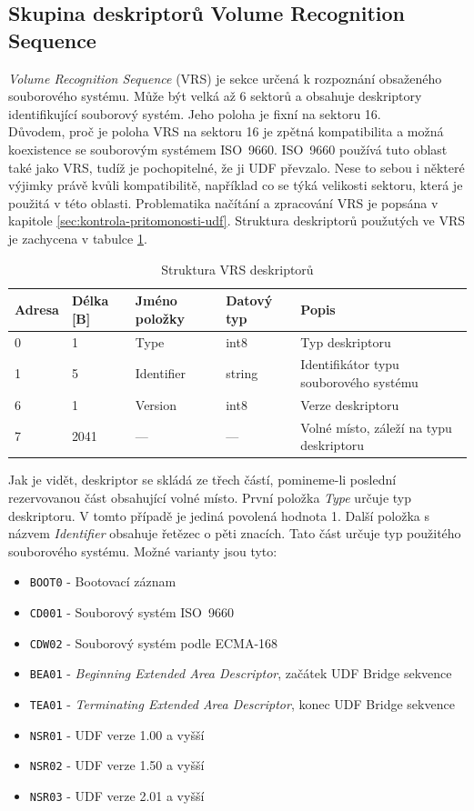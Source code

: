 \subsection{Skupina deskriptorů Volume Recognition Sequence}
\label{subsec:vrs}
\textit{Volume Recognition Sequence} (VRS) je sekce určená k rozpoznání obsaženého souborového systému. Může být velká až 6 sektorů a obsahuje deskriptory identifikující souborový systém. Jeho poloha je fixní na sektoru 16.\\
Důvodem, proč je poloha VRS na sektoru 16 je zpětná kompatibilita a možná koexistence se souborovým systémem ISO~9660. ISO~9660 používá tuto oblast také jako VRS, tudíž je pochopitelné, že ji UDF převzalo. Nese to sebou i některé výjimky právě kvůli kompatibilitě, například co se týká velikosti sektoru, která je použitá v této oblasti. Problematika načítání a zpracování VRS je popsána v kapitole \ref{sec:kontrola-pritomonosti-udf}.
Struktura deskriptorů použutých ve VRS je zachycena v tabulce \ref{tab:vrs}.
\begin{table}
    \centering
    \begin{tabular}{ | l | l | l | l | l | }
        \hline
        Adresa  & Délka [B]   & Jméno položky & Datový typ    & Popis \\ \hline\hline
        0       & 1             & Type           & int8          & Typ deskriptoru \\ \hline
        1       & 5             & Identifier & string        & Identifikátor typu souborového systému \\ \hline
        6       & 1             & Version         & int8          & Verze deskriptoru \\ \hline
        7       & 2041          & ---           & ---           & Volné místo, záleží na typu deskriptoru \\ \hline
    \end{tabular}
    \caption{Struktura VRS deskriptorů\label{tab:vrs}}
\end{table}
Jak je vidět, deskriptor se skládá ze třech částí, pomineme-li poslední rezervovanou část obsahující volné místo. První položka \textit{Type} určuje typ deskriptoru. V tomto případě je jediná povolená hodnota 1. Další položka s názvem \textit{Identifier} obsahuje řetězec o pěti znacích. Tato část určuje typ použitého souborového systému. Možné varianty jsou tyto:
\begin{itemize}
    \item \texttt{BOOT0} - Bootovací záznam
    \item \texttt{CD001} - Souborový systém ISO~9660
    \item \texttt{CDW02} - Souborový systém podle ECMA-168 \cite{ecma-168}
    \item \texttt{BEA01} - \textit{Beginning Extended Area Descriptor}, začátek UDF Bridge sekvence
    \item \texttt{TEA01} - \textit{Terminating Extended Area Descriptor}, konec UDF Bridge sekvence
    \item \texttt{NSR01} - UDF verze 1.00 a vyšší
    \item \texttt{NSR02} - UDF verze 1.50 a vyšší
    \item \texttt{NSR03} - UDF verze 2.01 a vyšší
\end{itemize}

